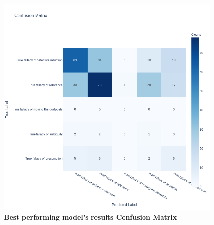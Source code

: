 \begin{figure}[H]
\centering
\includegraphics[width=\textwidth]{graphics/copi_confusion_matrix.png}
\caption{\textbf{Best performing model's results Confusion Matrix}}
\end{figure}

